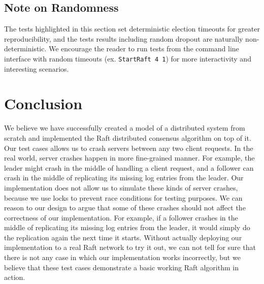 \documentclass[letterpaper,twocolumn,10pt]{article}
\begin{document}
\subsection{Note on Randomness}
The tests highlighted in this section set deterministic election timeouts for greater reproducibility, and the tests results including random dropout are naturally non-deterministic. We encourage the reader to run tests from the command line interface with random timeouts (ex. \texttt{StartRaft 4 1}) for more interactivity and interesting scenarios.

\section{Conclusion}
We believe we have successfully created a model of a distributed system from scratch and implemented the Raft distributed consensus algorithm on top of it. Our test cases allows us to crash servers between any two client requests. In the real world, server crashes happen in more fine-grained manner. For example, the leader might crash in the middle of handling a client request, and a follower can crash in the middle of replicating its missing log entries from the leader. Our implementation does not allow us to simulate these kinds of server crashes, because we use locks to prevent race conditions for testing purposes. We can reason to our design to argue that some of these crashes should not affect the correctness of our implementation. For example, if a follower crashes in the middle of replicating its missing log entries from the leader, it would simply do the replication again the next time it starts. Without actually deploying our implementation to a real Raft network to try it out, we can not tell for sure that there is not any case in which our implementation works incorrectly, but we believe that these test cases demonstrate a basic working Raft algorithm in action.




\end{document}
